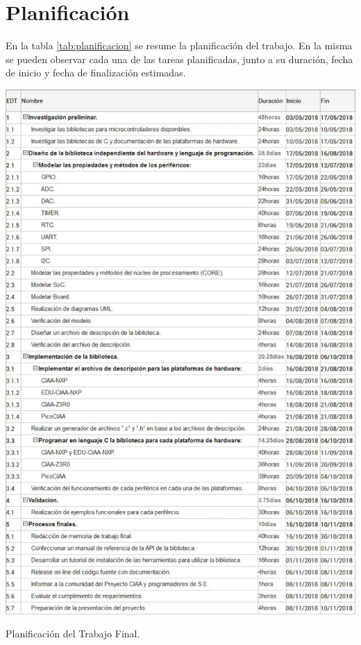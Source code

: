 \section{Planificación}
\label{sec:planificacion}

En la tabla \ref{tab:planificacion} se resume la planificación del trabajo. En la misma se pueden observar cada una de las tareas planificadas, junto a su duración, fecha de inicio y fecha de finalización estimadas.

\begin{table}[!htbp]
\centering
\includegraphics*[width=16cm]{Figures/GanttSP.png}
\par\caption{Planificación del Trabajo Final.}\label{tab:planificacion}
\end{table}